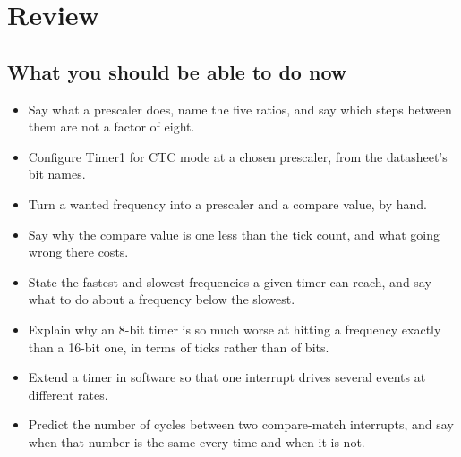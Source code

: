 
\section{Review}
\label{c5:sec:review}

\subsection*{What you should be able to do now}
\begin{itemize}
  \item Say what a prescaler does, name the five ratios, and say which steps between them are not a
    factor of eight.
  \item Configure Timer1 for CTC mode at a chosen prescaler, from the datasheet's bit names.
  \item Turn a wanted frequency into a prescaler and a compare value, by hand.
  \item Say why the compare value is one less than the tick count, and what going wrong there costs.
  \item State the fastest and slowest frequencies a given timer can reach, and say what to do about
    a frequency below the slowest.
  \item Explain why an 8-bit timer is so much worse at hitting a frequency exactly than a 16-bit
    one, in terms of ticks rather than of bits.
  \item Extend a timer in software so that one interrupt drives several events at different rates.
  \item Predict the number of cycles between two compare-match interrupts, and say when that number
    is the same every time and when it is not.
\end{itemize}

